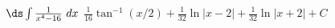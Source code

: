 {$\ds \int \frac{1}{x^4-16}\ dx$}
{$\frac{1}{16}\tan^{-1}(x/2)+\frac{1}{32}\ln |x-2|+\frac1{32}\ln|x+2|+C$}
